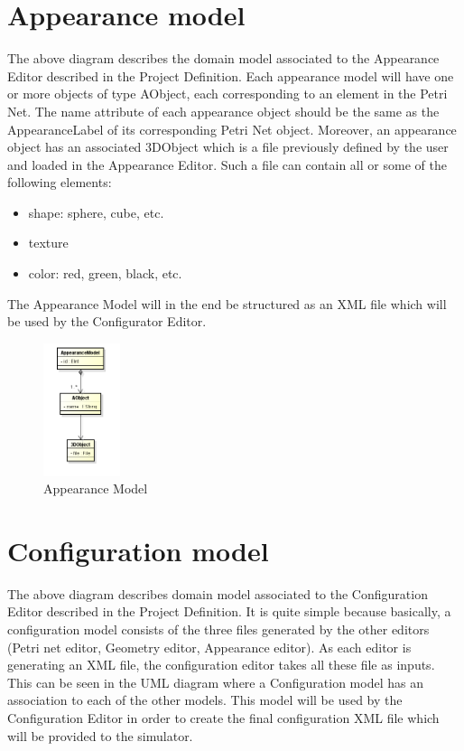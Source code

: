 \documentclass[11pt]{article}   %
\begin{document}
\newpage
\section{Appearance model}

The above diagram describes the domain model associated to the Appearance Editor described in the Project Definition. 
Each appearance model will have one or more objects of type AObject, each corresponding to an element in the Petri Net. The name attribute of each appearance object should be the same as the AppearanceLabel of its corresponding Petri Net object. Moreover, an appearance object has an associated 3DObject which is a file previously defined by the user and loaded in the Appearance Editor. Such a file can contain all or some of the following elements: 
\begin{itemize}
\item shape: sphere, cube, etc.
\item texture
\item color: red, green, black, etc.
\end{itemize}

The Appearance Model will in the end be structured as an XML file which will be used by the Configurator Editor.    

\begin{figure}[htp]
\begin{center}
  \includegraphics[width=0.2\textwidth]{image/appearance_model.png}
  \caption{Appearance Model}
  \label{fig:appearance_model}
\end{center}
\end{figure}

\newpage
\section{Configuration model}

The above diagram describes domain model associated to the Configuration Editor described in the Project Definition. It is quite simple because basically, a configuration model consists of the three files generated by the other editors (Petri net editor, Geometry editor, Appearance editor).
As each editor is generating an XML file, the configuration editor takes all these file as inputs. This can be seen in the UML diagram where a Configuration model has an association to each of the other models.
This model will be used by the Configuration Editor in order to create the final configuration XML file which will be provided to the simulator.
\end{document}
